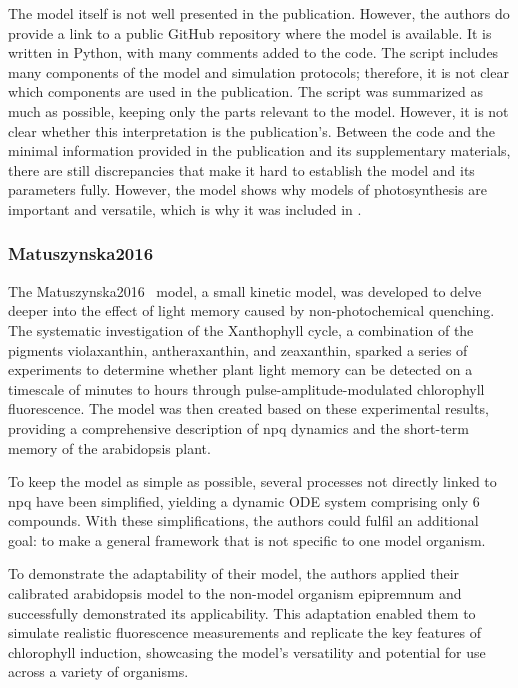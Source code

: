 The model itself is not well presented in the publication. However, the authors do provide a link to a public GitHub repository where the model is available. It is written in Python, with many comments added to the code. The script includes many components of the model and simulation protocols; therefore, it is not clear which components are used in the publication. The script was summarized as much as possible, keeping only the parts relevant to the model. However, it is not clear whether this interpretation is the publication's. Between the code and the minimal information provided in the publication and its supplementary materials, there are still discrepancies that make it hard to establish the model and its parameters fully. However, the model shows why models of photosynthesis are important and versatile, which is why it was included in \greensloth{}.

\subsubsection{Matuszynska2016}
The Matuszynska2016~\cite{matuszynskaMathematicalModelNonphotochemical2016} model, a small kinetic model, was developed to delve deeper into the effect of light memory caused by non-photochemical quenching. The systematic investigation of the Xanthophyll cycle, a combination of the pigments violaxanthin, antheraxanthin, and zeaxanthin, sparked a series of experiments to determine whether plant light memory can be detected on a timescale of minutes to hours through pulse-amplitude-modulated chlorophyll fluorescence. The model was then created based on these experimental results, providing a comprehensive description of \gls{npq} dynamics and the short-term memory of the \gls{arabidopsis} plant.

To keep the model as simple as possible, several processes not directly linked to \gls{npq} have been simplified, yielding a dynamic ODE system comprising only 6 compounds. With these simplifications, the authors could fulfil an additional goal: to make a general framework that is not specific to one model organism.

To demonstrate the adaptability of their model, the authors applied their calibrated \gls{arabidopsis} model to the non-model organism \gls{epipremnum} and successfully demonstrated its applicability. This adaptation enabled them to simulate realistic fluorescence measurements and replicate the key features of chlorophyll induction, showcasing the model's versatility and potential for use across a variety of organisms.

